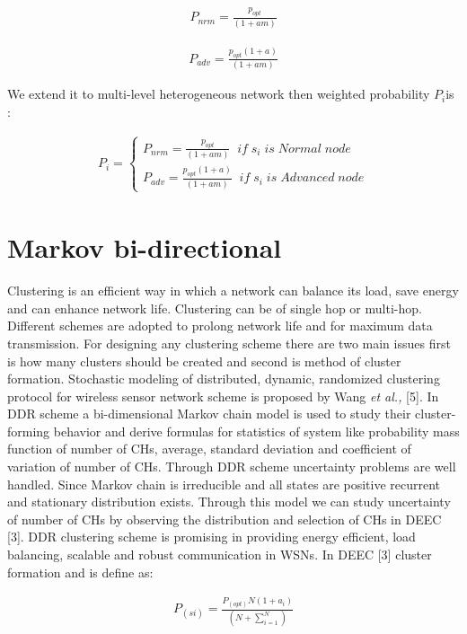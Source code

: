 \documentclass[10pt, conference, compsocconf]{IEEEtran}
\begin{document}
\begin{eqnarray}
P_{nrm}=\frac{p_{opt}}{(1+am)}
\end{eqnarray}

\begin{eqnarray}
P_{adv}=\frac{p_{opt}(1+a)}{(1+am)}
\end{eqnarray}

We extend it to multi-level heterogeneous network then weighted probability $P_{i}$is :

\begin{eqnarray}
P_{i}=
\begin{cases}P_{nrm}=\frac{p_{opt}}{(1+am)} \;\; if \; s_{i} \; is \;Normal \;node \\
P_{adv}=\frac{p_{opt}(1+a)}{(1+am)}         \;\; if \; s_{i} \; is \; Advanced \;node
\end{cases}
\end{eqnarray}


\section{Markov bi-directional}
Clustering is an efficient way in which a network can balance its load, save energy and can enhance network life. Clustering can be of single hop or multi-hop. Different schemes are adopted to prolong network life and for maximum data transmission. For designing any clustering scheme there are two main issues first is how many clusters should be created and second is method of cluster formation. Stochastic modeling of distributed, dynamic, randomized clustering protocol for wireless sensor network scheme is proposed by Wang \textit{et al.,} [5]. In DDR scheme a bi-dimensional Markov chain model is used to study their cluster-forming behavior and derive formulas for statistics of system like probability mass function of number of CHs, average, standard deviation and coefficient of variation of number of CHs. Through DDR scheme uncertainty problems are well handled. Since Markov chain is irreducible and all states are positive recurrent and stationary distribution exists. Through this model we can study uncertainty of number of CHs by observing the distribution and selection of CHs in DEEC [3]. DDR clustering scheme is promising in providing energy efficient, load balancing, scalable and robust communication in WSNs. In DEEC [3] cluster formation and is define as:

\begin{eqnarray}
P_{(si)}=\frac{P_{(opt)}N(1+a_{i})}{(N+\sum^{N}_{i=1})}
\end{eqnarray}
\end{document}
